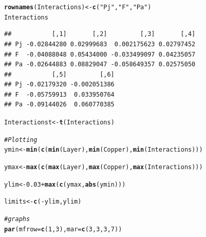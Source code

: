 \documentclass{article}\usepackage[]{graphicx}\usepackage[]{color}
\makeatletter
\newcommand{\hlnum}[1]{\textcolor[rgb]{0.686,0.059,0.569}{#1}}%
\newcommand{\hlstr}[1]{\textcolor[rgb]{0.192,0.494,0.8}{#1}}%
\newcommand{\hlcom}[1]{\textcolor[rgb]{0.678,0.584,0.686}{\textit{#1}}}%
\newcommand{\hlopt}[1]{\textcolor[rgb]{0,0,0}{#1}}%
\newcommand{\hlstd}[1]{\textcolor[rgb]{0.345,0.345,0.345}{#1}}%
\newcommand{\hlkwb}[1]{\textcolor[rgb]{0.69,0.353,0.396}{#1}}%
\newcommand{\hlkwc}[1]{\textcolor[rgb]{0.333,0.667,0.333}{#1}}%
\newcommand{\hlkwd}[1]{\textcolor[rgb]{0.737,0.353,0.396}{\textbf{#1}}}%
\newenvironment{kframe}{%
 \def\at@end@of@kframe{}%
 \ifinner\ifhmode%
  \def\at@end@of@kframe{\end{minipage}}%
  \begin{minipage}{\columnwidth}%
 \fi\fi%
 \def\FrameCommand##1{\hskip\@totalleftmargin \hskip-\fboxsep
 \colorbox{shadecolor}{##1}\hskip-\fboxsep
     \hskip-\linewidth \hskip-\@totalleftmargin \hskip\columnwidth}%
 \MakeFramed {\advance\hsize-\width
   \@totalleftmargin\z@ \linewidth\hsize
   \@setminipage}}%
 {\par\unskip\endMakeFramed%
 \at@end@of@kframe}
\newenvironment{knitrout}{}{} %
\makeatother
\begin{document}
\begin{knitrout}
\begin{kframe}
{\ttfamily\noindent\bfseries\color{errorcolor}{\#\# Error in eval(expr, envir, enclos): object 'axislabels' not found}}\begin{alltt}
\hlkwd{rownames}\hlstd{(Interactions)} \hlkwb{<-} \hlkwd{c}\hlstd{(}\hlstr{"Pj"}\hlstd{,} \hlstr{"F"}\hlstd{,} \hlstr{"Pa"}\hlstd{)}
\hlstd{Interactions}
\end{alltt}
\begin{verbatim}
##           [,1]       [,2]         [,3]       [,4]
## Pj -0.02844280 0.02999683  0.002175623 0.02797452
## F  -0.04088048 0.05434000 -0.033499097 0.04235057
## Pa -0.02644883 0.08829047 -0.058649357 0.02575050
##           [,5]         [,6]
## Pj -0.02179320 -0.002051386
## F  -0.05759913  0.033950764
## Pa -0.09144026  0.060770385
\end{verbatim}
\begin{alltt}
\hlstd{Interactionst}\hlkwb{<-}\hlkwd{t}\hlstd{(Interactions)}

\hlcom{# Plotting}
\hlstd{ymin}\hlkwb{<-}\hlkwd{min}\hlstd{(}\hlkwd{c}\hlstd{(}\hlkwd{min}\hlstd{(Layer),}\hlkwd{min}\hlstd{(Copper),}\hlkwd{min}\hlstd{(Interactions)))}

\hlstd{ymax}\hlkwb{<-}\hlkwd{max}\hlstd{(}\hlkwd{c}\hlstd{(}\hlkwd{max}\hlstd{(Layer),}\hlkwd{max}\hlstd{(Copper),}\hlkwd{max}\hlstd{(Interactions)))}

\hlstd{ylim}\hlkwb{<-}\hlnum{0.03}\hlopt{+}\hlkwd{max}\hlstd{(}\hlkwd{c}\hlstd{(ymax,}\hlkwd{abs}\hlstd{(ymin)))}

\hlstd{limits}\hlkwb{<-}\hlkwd{c}\hlstd{(}\hlopt{-}\hlstd{ylim,ylim)}

\hlcom{#graphs}
\hlkwd{par}\hlstd{(}\hlkwc{mfrow}\hlstd{=}\hlkwd{c}\hlstd{(}\hlnum{1}\hlstd{,}\hlnum{3}\hlstd{),}\hlkwc{mar}\hlstd{=}\hlkwd{c}\hlstd{(}\hlnum{3}\hlstd{,}\hlnum{3}\hlstd{,}\hlnum{3}\hlstd{,}\hlnum{7}\hlstd{))}


\end{alltt}
\end{kframe}
\end{knitrout}
\end{document}
